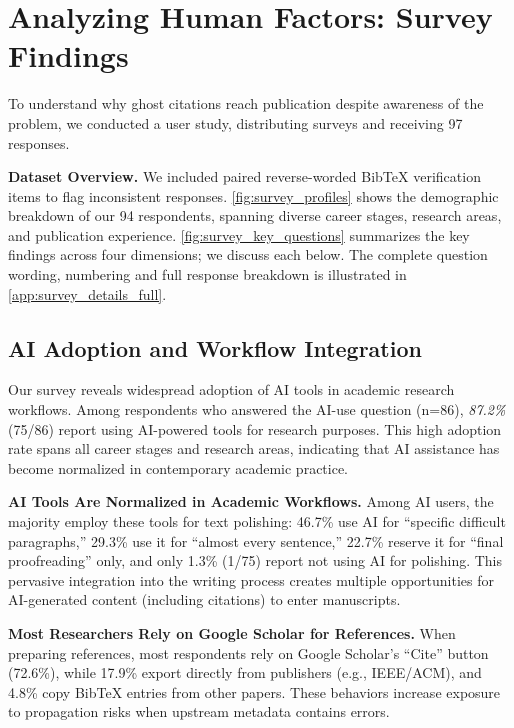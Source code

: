\section{Analyzing Human Factors: Survey Findings}
\label{sec:survey_results}

To understand why ghost citations reach publication despite awareness of the problem, we conducted a user study, distributing surveys and receiving 97 responses.



\noindent
\textbf{Dataset Overview.}
We included paired reverse-worded BibTeX verification items to flag inconsistent responses.  
\cref{fig:survey_profiles} shows the demographic breakdown of our 94 respondents, spanning diverse career stages, research areas, and publication experience.
\cref{fig:survey_key_questions} summarizes the key findings across four dimensions; we discuss each below. 
The complete question wording, numbering and full response breakdown is illustrated in \cref{app:survey_details_full}.

\subsection{AI Adoption and Workflow Integration}

Our survey reveals widespread adoption of AI tools in academic research workflows.
Among respondents who answered the AI-use question (n=86), \textit{87.2\%} (75/86) report using AI-powered tools for research purposes.
This high adoption rate spans all career stages and research areas, indicating that AI assistance has become normalized in contemporary academic practice.

\noindent
\textbf{AI Tools Are Normalized in Academic Workflows.}
Among AI users, the majority employ these tools for text polishing:
46.7\% use AI for ``specific difficult paragraphs,''
29.3\% use it for ``almost every sentence,'' 22.7\% reserve it for ``final proofreading'' only,
and only 1.3\% (1/75) report not using AI for polishing.
This pervasive integration into the writing process creates multiple opportunities for AI-generated content (including citations) to enter manuscripts.

\noindent
\textbf{Most Researchers Rely on Google Scholar for References.}
When preparing references, most respondents rely on Google Scholar's ``Cite'' button (72.6\%), while 17.9\% export directly from publishers (e.g., IEEE/ACM), and 4.8\% copy BibTeX entries from other papers.
These behaviors increase exposure to propagation risks when upstream metadata contains errors.

